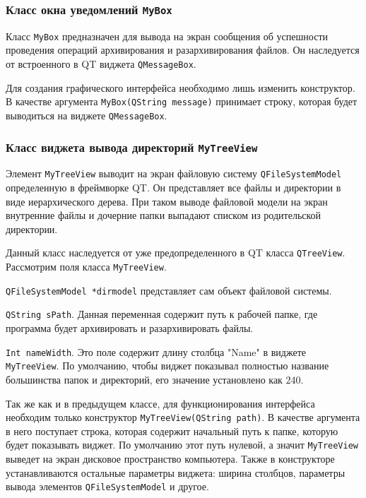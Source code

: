 \subsubsection{Класс окна уведомлений \texttt{MyBox}}

Класс \texttt{MyBox} предназначен для вывода на экран сообщения об успешности проведения операций архивирования и разархивирования файлов.
Он наследуется от встроенного в QT виджета \texttt{QMessageBox}\cite{box}.



Для создания графического интерфейса необходимо лишь изменить конструктор.
В качестве аргумента \texttt{MyBox(QString message)}\cite{qt_doc} принимает строку, которая будет выводиться на виджете \texttt{QMessageBox}.



\subsubsection{Класс виджета вывода директорий \texttt{MyTreeView}}

Элемент \texttt{MyTreeView} выводит на экран файловую систему \texttt{QFileSystemModel}\cite{filemodel} определенную в фреймворке QT.
Он представляет все файлы и директории в виде иерархического дерева\cite{treeview}.
При таком выводе файловой модели на экран внутренние файлы и дочерние папки выпадают списком из родительской директории.



Данный класс наследуется от уже предопределенного в QT класса \texttt{QTreeView}\cite{treeview}.
Рассмотрим поля класса \texttt{MyTreeView}.



\texttt{QFileSystemModel *dirmodel} представляет сам объект файловой системы\cite{filemodel}.



\texttt{QString sPath}\cite{QT}. 
Данная переменная содержит путь к рабочей папке, где программа будет архивировать и разархивировать файлы.



\texttt{Int nameWidth}.
Это поле содержит длину столбца "Name" в виджете \texttt{MyTreeView}.
По умолчанию, чтобы виджет показывал полностью название большинства папок и директорий, его значение установлено как 240.



Так же как и в предыдущем классе, для функционирования интерфейса необходим только конструктор \texttt{MyTreeView(QString path)}.
В качестве аргумента в него поступает строка, которая содержит начальный путь к папке, которую будет показывать виджет.
По умолчанию этот путь нулевой, а значит \texttt{MyTreeView} выведет на экран дисковое пространство компьютера\cite{treeview}.
Также в конструкторе устанавливаются остальные параметры виджета: ширина столбцов, параметры вывода элементов \texttt{QFileSystemModel} и другое.



